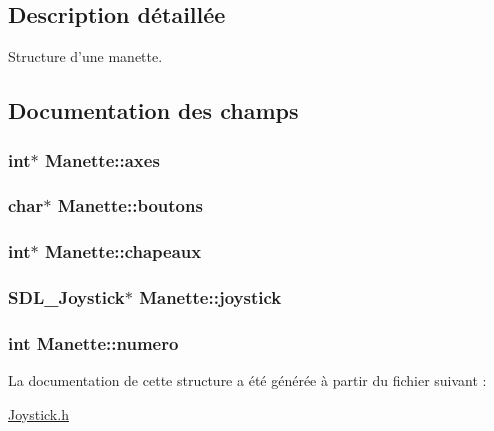 \subsection{Description détaillée}
Structure d'une manette. 

\subsection{Documentation des champs}
\hypertarget{structManette_abc9f5234f07d79af9735b501956a8d60}{
\subsubsection[{axes}]{\setlength{\rightskip}{0pt plus 5cm}int$\ast$ Manette\-::axes}}\label{structManette_abc9f5234f07d79af9735b501956a8d60}
\hypertarget{structManette_a07814b5f1ebd865b6e15d2094cf5d671}{
\subsubsection[{boutons}]{\setlength{\rightskip}{0pt plus 5cm}char$\ast$ Manette\-::boutons}}\label{structManette_a07814b5f1ebd865b6e15d2094cf5d671}
\hypertarget{structManette_ab12d322b8fadc5e42218b065e7f86d65}{
\subsubsection[{chapeaux}]{\setlength{\rightskip}{0pt plus 5cm}int$\ast$ Manette\-::chapeaux}}\label{structManette_ab12d322b8fadc5e42218b065e7f86d65}
\hypertarget{structManette_ad11c45cf2d1afa059fae52ab61a177d8}{
\subsubsection[{joystick}]{\setlength{\rightskip}{0pt plus 5cm}S\-D\-L\-\_\-\-Joystick$\ast$ Manette\-::joystick}}\label{structManette_ad11c45cf2d1afa059fae52ab61a177d8}
\hypertarget{structManette_aedc72637b122d8d34ce23f4cf98be10b}{
\subsubsection[{numero}]{\setlength{\rightskip}{0pt plus 5cm}int Manette\-::numero}}\label{structManette_aedc72637b122d8d34ce23f4cf98be10b}


La documentation de cette structure a été générée à partir du fichier suivant \-:\begin{DoxyCompactItemize}
\item 
\hyperlink{Joystick_8h}{Joystick.\-h}\end{DoxyCompactItemize}
